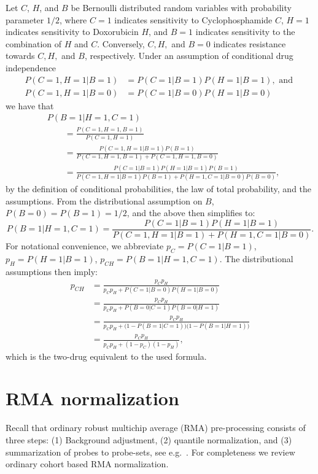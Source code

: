 Let $C$, $H$, and $B$ be Bernoulli distributed random variables with probability parameter $1/2$, where
$C = 1$ indicates sensitivity to Cyclophosphamide $C$,
$H = 1$ indicates sensitivity to Doxorubicin $H$, and
$B = 1$ indicates sensitivity to the combination of $H$ and $C$.
Conversely, $C,H,$ and $B = 0$ indicates resistance towards $C,H,$ and $B$, respectively.
Under an assumption of conditional drug independence
\begin{align*}
  P(C=1, H=1| B=1) &= P(C=1 | B=1) P(H=1 | B=1), \text{ and } \\
  P(C=1, H=1| B=0) &= P(C=1 | B=0) P(H=1 | B=0)
\end{align*}
we have that
\begin{align*}
  &P(B=1 | H=1, C=1)
  \\&\qquad
   = \frac{P(C=1, H=1, B=1)}
          {P(C=1, H=1)}
  \\&\qquad
   = \frac{P(C=1, H=1 | B=1) P(B=1)}
          {P(C=1, H=1, B=1) + P(C=1, H=1, B=0)}
  \\&\qquad
   = \frac{P(C=1 | B=1) P(H=1 | B=1) P(B=1)}
          {P(C=1, H=1 | B=1) P(B=1) + P(H=1, C=1| B=0) P(B=0)},
\end{align*}
by the definition of conditional probabilities, the law of total probability, and the assumptions.
From the distributional assumption on $B$, $P(B=0) = P(B=1) = 1/2$, and the above then simplifies to:
\begin{equation*}
  P(B=1 | H=1, C=1)
   = \frac{P(C=1 | B=1) P(H=1 | B=1)}
          {P(C=1, H=1 | B=1) + P(H=1, C=1 | B=0)}.
\end{equation*}
For notational convenience, we abbreviate
$p_C = P(C=1 | B=1)$,
$p_H = P(H=1 | B=1)$,
$p_{CH} = P(B=1 | H=1, C=1)$.
The distributional assumptions then imply:
\begin{align*}
  p_{CH}
  &= \frac{p_C p_H}
          {p_C p_H + P(C=1 | B=0) P(H=1 | B=0)}
  \\
  &= \frac{p_C p_H}
          {p_C p_H + P(B=0 | C=1) P(B=0 | H=1)}
  \\
  &= \frac{p_C p_H}
          {p_C p_H + \bigl(1 - P(B=1 | C=1)\bigr)\bigl(1 - P(B=1 | H=1)\bigr)}
  \\
  &= \frac{p_C p_H}
          {p_C p_H + (1 - p_C)(1 - p_H)},
\end{align*}
which is the two-drug equivalent to the used formula.




\section{RMA normalization}
Recall that ordinary robust multichip average (RMA) pre-processing consists of three steps: (1) Background adjustment, (2) quantile normalization, and (3) summarization of probes to probe-sets, see e.g.\ \citep{Irizarry2003, Irizarry2003b}. For completeness we review ordinary cohort based RMA normalization.

